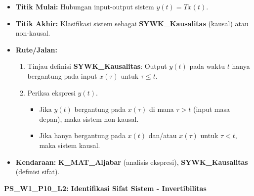 \documentclass[
  letterpaper,
  DIV=11,
  numbers=noendperiod]{scrreprt}
\providecommand{\tightlist}{%
  \setlength{\itemsep}{0pt}\setlength{\parskip}{0pt}}\usepackage{longtable,booktabs,array}
\begin{document}
\begin{itemize}
\tightlist
\item
  \textbf{Titik Mulai:} Hubungan input-output sistem \(y(t) = T{x(t)}\).
\item
  \textbf{Titik Akhir:} Klasifikasi sistem sebagai
  \textbf{SYWK\_Kausalitas} (kausal) atau non-kausal.
\item
  \textbf{Rute/Jalan:}

  \begin{enumerate}
  \def\labelenumi{\arabic{enumi}.}
  \tightlist
  \item
    Tinjau definisi \textbf{SYWK\_Kausalitas}: Output \(y(t)\) pada
    waktu \(t\) hanya bergantung pada input \(x(\tau)\) untuk
    \(\tau \le t\).
  \item
    Periksa ekspresi \(y(t)\).

    \begin{itemize}
    \tightlist
    \item
      Jika \(y(t)\) bergantung pada \(x(\tau)\) di mana \(\tau > t\)
      (input masa depan), maka sistem non-kausal.
    \item
      Jika hanya bergantung pada \(x(t)\) dan/atau \(x(\tau)\) untuk
      \(\tau < t\), maka sistem kausal.
    \end{itemize}
  \end{enumerate}
\item
  \textbf{Kendaraan:} \textbf{K\_MAT\_Aljabar} (analisis ekspresi),
  \textbf{SYWK\_Kausalitas} (definisi sifat).
\end{itemize}

\textbf{PS\_W1\_P10\_L2: Identifikasi Sifat Sistem - Invertibilitas}
\end{document}
